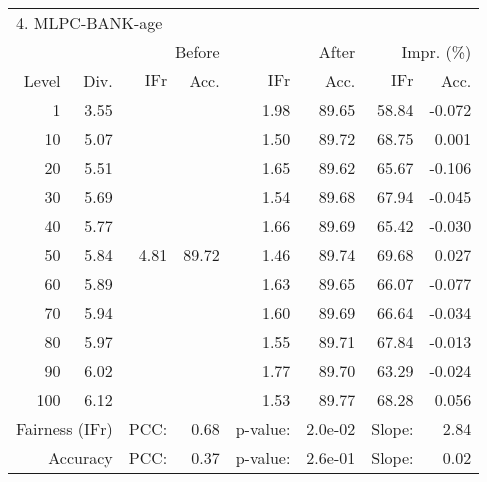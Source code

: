 \begin{tabular}{rr||rr|rr|rr}
\multicolumn{4}{l}{4. MLPC-BANK-age} & \multicolumn{2}{c}{} & \multicolumn{2}{c}{}\\
 &  & \multicolumn{2}{r|}{Before} & \multicolumn{2}{r|}{After} & \multicolumn{2}{r}{Impr. (\%)}\\
Level & Div. & $\mathrm{IFr}$ & Acc. & $\mathrm{IFr}$ & Acc. & $\mathrm{IFr}$ & Acc.\\
\hline
1 & 3.55 & \multirow{11}{*}{4.81} & \multirow{11}{*}{89.72} & 1.98 & 89.65 & 58.84 & -0.072\\
10 & 5.07 &  &  & 1.50 & 89.72 & 68.75 & 0.001\\
20 & 5.51 &  &  & 1.65 & 89.62 & 65.67 & -0.106\\
30 & 5.69 &  &  & 1.54 & 89.68 & 67.94 & -0.045\\
40 & 5.77 &  &  & 1.66 & 89.69 & 65.42 & -0.030\\
50 & 5.84 &  &  & 1.46 & 89.74 & 69.68 & 0.027\\
60 & 5.89 &  &  & 1.63 & 89.65 & 66.07 & -0.077\\
70 & 5.94 &  &  & 1.60 & 89.69 & 66.64 & -0.034\\
80 & 5.97 &  &  & 1.55 & 89.71 & 67.84 & -0.013\\
90 & 6.02 &  &  & 1.77 & 89.70 & 63.29 & -0.024\\
100 & 6.12 &  &  & 1.53 & 89.77 & 68.28 & 0.056\\
\hline
\multicolumn{2}{r}{Fairness ($\mathrm{IFr}$)} & PCC: & \multicolumn{1}{r}{0.68} & p-value:  & \multicolumn{1}{r}{2.0e-02} & Slope:  & 2.84\\
\multicolumn{2}{r}{Accuracy} & PCC: & \multicolumn{1}{r}{0.37} & p-value:  & \multicolumn{1}{r}{2.6e-01} & Slope:  & 0.02\\
\end{tabular}